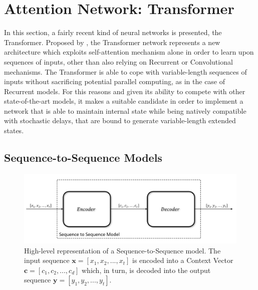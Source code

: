     \section{Attention Network: Transformer}
    \label{sota:selfan}
        In this section, a fairly recent kind of neural networks is presented, the Transformer. Proposed by , the Transformer network represents a new architecture which exploits self-attention mechanism alone in order to learn upon sequences of inputs, other than also relying on Recurrent or Convolutional mechanisms. The Transformer is able to cope with variable-length sequences of inputs without sacrificing potential parallel computing, as in the case of Recurrent models. For this reasons and given its ability to compete with other state-of-the-art models, it makes a suitable candidate in order to implement a network that is able to maintain internal state while being natively compatible with stochastic delays, that are bound to generate variable-length extended states.
        
        \subsection{Sequence-to-Sequence Models}
        \label{sub:seq2seq}
            \begin{figure}[b]
                    \centering
                    \includegraphics[width=15cm, keepaspectratio]{images/an/seq2seq.png}
                    \caption{High-level representation of a Sequence-to-Sequence model. The input sequence $\mathbf{x} = \left[x_1, x_2, ..., x_t \right]$ is encoded into a Context Vector $\mathbf{c} = \left[c_1, c_2, ..., c_d \right]$ which, in turn, is decoded into the output sequence $\mathbf{y} = \left[y_1, y_2, ..., y_t \right]$.}
                    \label{fig:an_seq2seq}
            \end{figure}
        

